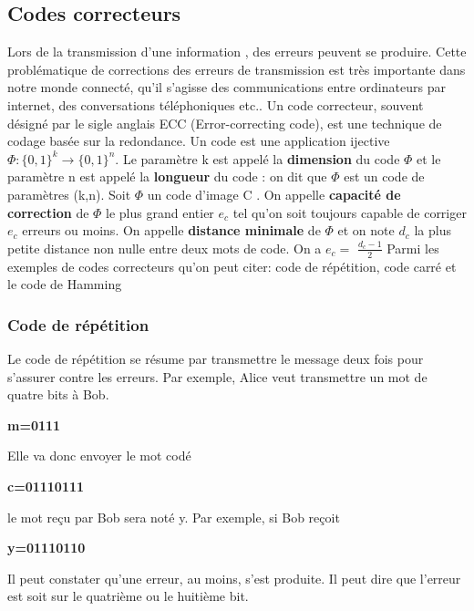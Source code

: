 \documentclass[french,nochapter,11pt]{rapportUB}
\begin{document}
\subsection{Codes correcteurs}
Lors de la transmission d'une information , des erreurs peuvent se produire. Cette problématique de corrections des erreurs de transmission est très importante dans notre monde connecté, qu'il s'agisse des communications entre ordinateurs par internet, des conversations téléphoniques etc.. \newline
Un code correcteur, souvent désigné par le sigle anglais ECC (Error-correcting code), est une technique de codage basée sur la redondance. \newline
Un code est une application ijective $\Phi:\{0,1\}^k \rightarrow \{0,1\}^n $. \newline
Le paramètre k est appelé la \textbf{dimension} du code $\Phi$ et le paramètre n est appelé la \textbf{longueur} du code : on dit que $\Phi$ est un code de paramètres (k,n). \newline
Soit $\Phi$ un code d'image C . \newline
On appelle \textbf{capacité de correction} de $\Phi$ le plus grand entier $e_c$ tel qu'on soit toujours capable de corriger $e_c$ erreurs ou moins. \newline
On appelle \textbf{distance minimale} de $\Phi$ et on note $d_c$ la plus petite distance non nulle entre deux mots de code. \newline
On a \textbf{$e_c = $} $\frac{d_c-1}{2}$
Parmi les exemples de codes correcteurs qu'on peut citer: code de répétition, code carré et le code de Hamming
\subsubsection{Code de répétition}
Le code de répétition se résume par transmettre le message deux fois pour s'assurer contre les erreurs. Par exemple, Alice veut transmettre un mot de quatre bits à Bob. 
\begin{tabbing}
\hspace{5cm}\textbf{m=0111} \newline
\end{tabbing}
Elle va donc envoyer le mot codé
\begin{tabbing}
    \hspace{5cm}\textbf{c=01110111}
\end{tabbing}
le mot reçu par Bob sera noté y. Par exemple, si Bob reçoit
\begin{tabbing}
    \hspace{5cm}\textbf{y=01110110}
\end{tabbing}
Il peut constater qu'une erreur, au moins, s'est produite. Il peut dire que l'erreur est soit sur le quatrième ou le huitième bit.
\end{document}
